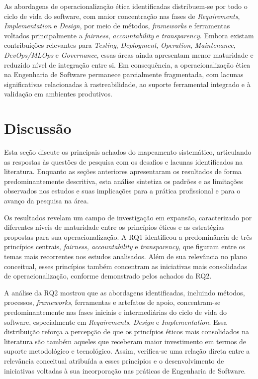 \begin{tcolorbox}[colback=blue!5!white, colframe=blue!60!black, title=Resumo da RQ2]
As abordagens de operacionalização ética identificadas distribuem-se por todo o ciclo de vida do software, com maior concentração nas fases de \textit{Requirements}, \textit{Implementation} e \textit{Design}, por meio de métodos, \textit{frameworks} e ferramentas voltados principalmente a \textit{fairness}, \textit{accountability} e \textit{transparency}. Embora existam contribuições relevantes para \textit{Testing}, \textit{Deployment}, \textit{Operation}, \textit{Maintenance}, \textit{DevOps/MLOps} e \textit{Governance}, essas áreas ainda apresentam menor maturidade e reduzido nível de integração entre si. Em consequência, a operacionalização ética na Engenharia de Software permanece parcialmente fragmentada, com lacunas significativas relacionadas à rastreabilidade, ao suporte ferramental integrado e à validação em ambientes produtivos.
\end{tcolorbox}

\section{Discussão}
\label{sec:discussion}

Esta seção discute os principais achados do mapeamento sistemático, articulando as respostas às questões de pesquisa com os desafios e lacunas identificados na literatura. Enquanto as seções anteriores apresentaram os resultados de forma predominantemente descritiva, esta análise sintetiza os padrões e as limitações observados nos estudos e suas implicações para a prática profissional e para o avanço da pesquisa na área.

Os resultados revelam um campo de investigação em expansão, caracterizado por diferentes níveis de maturidade entre os princípios éticos e as estratégias propostas para sua operacionalização. A RQ1 identificou a predominância de três princípios centrais, \textit{fairness}, \textit{accountability} e \textit{transparency}, que figuram entre os temas mais recorrentes nos estudos analisados. Além de sua relevância no plano conceitual, esses princípios também concentram as iniciativas mais consolidadas de operacionalização, conforme demonstrado pelos achados da RQ2.

A análise da RQ2 mostrou que as abordagens identificadas, incluindo métodos, processos, \textit{frameworks}, ferramentas e artefatos de apoio, concentram-se predominantemente nas fases iniciais e intermediárias do ciclo de vida do software, especialmente em \textit{Requirements}, \textit{Design} e \textit{Implementation}. Essa distribuição reforça a percepção de que os princípios éticos mais consolidados na literatura são também aqueles que receberam maior investimento em termos de suporte metodológico e tecnológico. Assim, verifica-se uma relação direta entre a relevância conceitual atribuída a esses princípios e o desenvolvimento de iniciativas voltadas à sua incorporação nas práticas de Engenharia de Software.

